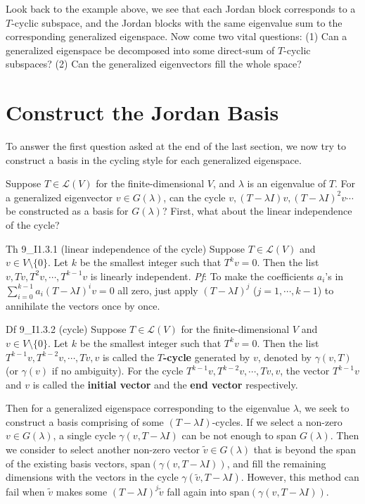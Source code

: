 \documentclass{article}
\begin{document}
Look back to the example above, we see that each Jordan block corresponds to a $T$-cyclic subspace, and the Jordan blocks with the same eigenvalue sum to the corresponding generalized eigenspace. Now come two vital questions: (1) Can a generalized eigenspace be decomposed into some direct-sum of $T$-cyclic subspaces? (2) Can the generalized eigenvectors fill the whole space? 

\section{Construct the Jordan Basis}
To answer the first question asked at the end of the last section, we now try to construct a basis in the cycling style for each generalized eigenspace. 

Suppose $T\in\mathcal{L}(V)$ for the finite-dimensional $V$, and $\lambda$ is an eigenvalue of $T$. For a generalized eigenvector $v\in G(\lambda)$, can the cycle $v, (T-\lambda I)v, (T-\lambda I)^2v \cdots$ be constructed as a basis for $G(\lambda)$? First, what about the linear independence of the cycle?

\begin{Th}{Th 9\_I1.3.1 (linear independence of the cycle)}
    Suppose $T\in\mathcal{L}(V)$ and $v\in V\setminus\{0\}$. Let $k$ be the smallest integer such that $T^kv = 0$. Then the list $v, Tv, T^2v, \cdots, T^{k-1}v$ is linearly independent. 
    \tcblower
    \textit{Pf}: To make the coefficients $a_i$'s in $\sum_{i=0}^{k-1} a_i(T-\lambda I)^iv = 0$ all zero, just apply $(T-\lambda I)^{j}$ ($j=1, \cdots, k-1$) to annihilate the vectors once by once.
\end{Th}

\begin{Df}{Df 9\_I1.3.2 (cycle)}
    Suppose $T\in\mathcal{L}(V)$ for the finite-dimensional $V$ and $v\in V\setminus\{0\}$. Let $k$ be the smallest integer such that $T^kv = 0$. Then the list $T^{k-1}v, T^{k-2}v, \cdots, Tv, v$ is called the \textbf{$T$-cycle} generated by $v$, denoted by $\gamma(v, T)$ (or $\gamma(v)$ if no ambiguity). For the cycle $T^{k-1}v, T^{k-2}v, \cdots, Tv, v$, the vector $T^{k-1}v$ and $v$ is called the \textbf{initial vector} and the \textbf{end vector} respectively. 
\end{Df}

Then for a generalized eigenspace corresponding to the eigenvalue $\lambda$, we seek to construct a basis comprising of some $(T-\lambda I)$-cycles. If we select a non-zero $v\in G(\lambda)$, a single cycle $\gamma(v, T-\lambda I)$ can be not enough to span $G(\lambda)$. Then we consider to select another non-zero vector $\tilde{v}\in G(\lambda)$ that is beyond the span of the existing basis vectors, $\text{span}(\gamma(v, T-\lambda I))$, and fill the remaining dimensions with the vectors in the cycle $\gamma(\tilde{v}, T-\lambda I)$. However, this method can fail when $\tilde{v}$ makes some $(T-\lambda I)^j\tilde{v}$ fall again into $\text{span}(\gamma(v, T-\lambda I))$. 
\end{document}
